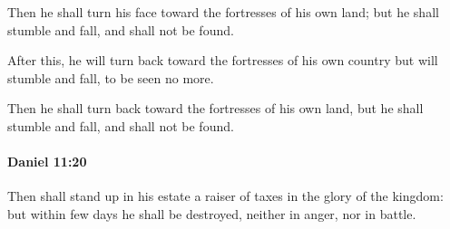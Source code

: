 			\begin{versebox}
					\item[BHS] 
					\item[LXX] 
					\item[ASV] Then he shall turn his face toward the fortresses of his own land; but he shall stumble and fall, and shall not be found.
					\item[NIV] After this, he will turn back toward the fortresses of his own country but will stumble and fall, to be seen no more.
					\item[NRSV] Then he shall turn back toward the fortresses of his own land, but he shall stumble and fall, and shall not be found.
			\end{versebox}

		\paragraph{Daniel 11:20} %
			\label{DANIEL-11-20}

			Then shall stand up in his estate a raiser of taxes in the glory of the kingdom: but within few days he shall be destroyed, neither in anger, nor in battle.

